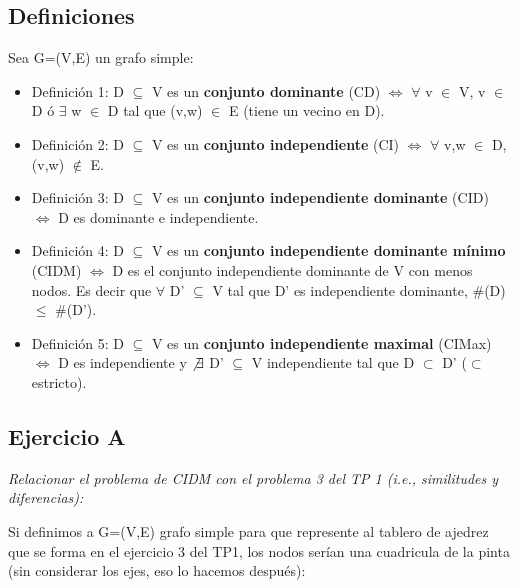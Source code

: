 \subsection{Definiciones}

Sea G=(V,E) un grafo simple:

\begin{itemize}
\item Definición 1: D $\subseteq$ V es un \textbf{conjunto dominante} (CD) $\iff$ $\forall$ v $\in$ V, v $\in$ D ó $\exists$ w $\in$ D tal que (v,w) $\in$ E (tiene un vecino en D).
\item Definición 2: D $\subseteq$ V es un \textbf{conjunto independiente} (CI) $\iff$ $\forall$ v,w $\in$ D, (v,w) $\not\in$ E.
\item Definición 3: D $\subseteq$ V es un \textbf{conjunto independiente dominante} (CID) $\iff$ D es dominante e independiente.
\item Definición 4: D $\subseteq$ V es un \textbf{conjunto independiente dominante mínimo} (CIDM) $\iff$ D es el conjunto independiente dominante de V con menos nodos. Es decir que $\forall$ D' $\subseteq$ V tal que D' es independiente dominante, \#(D) $\leq$ \#(D').
\item Definición 5: D $\subseteq$ V es un \textbf{conjunto independiente maximal} (CIMax) $\iff$ D es independiente y $\not\exists$ D' $\subseteq$ V independiente tal que D $\subset$ D' ($\subset$ estricto).
\end{itemize}

\subsection{Ejercicio A}

\textit{Relacionar el problema de CIDM con el problema 3 del TP 1 (i.e., similitudes y diferencias):}

\medskip

Si definimos a G=(V,E) grafo simple para que represente al tablero de ajedrez que se forma en el ejercicio 3 del TP1, los nodos serían una cuadricula de la pinta (sin considerar los ejes, eso lo hacemos después):

